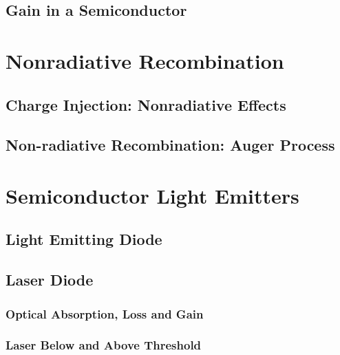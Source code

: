 \subsection{Gain in a Semiconductor}
\section{Nonradiative Recombination}
\subsection{Charge Injection: Nonradiative Effects}
\subsection{Non-radiative Recombination: Auger Process}
\section{Semiconductor Light Emitters}
\subsection{Light Emitting Diode}
\subsection{Laser Diode}
\subsubsection{Optical Absorption, Loss and Gain}
\subsubsection{Laser Below and Above Threshold}